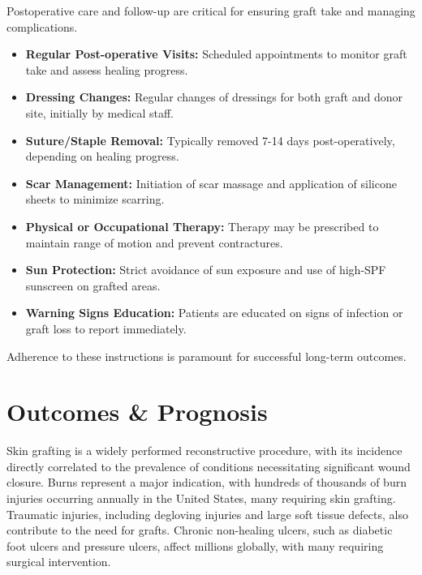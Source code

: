 Postoperative care and follow-up are critical for ensuring graft take and managing complications.

\begin{itemize}
  \item \textbf{Regular Post-operative Visits:} Scheduled appointments to monitor graft take and assess healing progress.
  
  \item \textbf{Dressing Changes:} Regular changes of dressings for both graft and donor site, initially by medical staff.
  
  \item \textbf{Suture/Staple Removal:} Typically removed 7-14 days post-operatively, depending on healing progress.
  
  \item \textbf{Scar Management:} Initiation of scar massage and application of silicone sheets to minimize scarring.
  
  \item \textbf{Physical or Occupational Therapy:} Therapy may be prescribed to maintain range of motion and prevent contractures.
  
  \item \textbf{Sun Protection:} Strict avoidance of sun exposure and use of high-SPF sunscreen on grafted areas.
  
  \item \textbf{Warning Signs Education:} Patients are educated on signs of infection or graft loss to report immediately.
\end{itemize}

Adherence to these instructions is paramount for successful long-term outcomes.

\section*{Outcomes \& Prognosis}
Skin grafting is a widely performed reconstructive procedure, with its incidence directly correlated to the prevalence of conditions necessitating significant wound closure. Burns represent a major indication, with hundreds of thousands of burn injuries occurring annually in the United States, many requiring skin grafting. Traumatic injuries, including degloving injuries and large soft tissue defects, also contribute to the need for grafts. Chronic non-healing ulcers, such as diabetic foot ulcers and pressure ulcers, affect millions globally, with many requiring surgical intervention.


